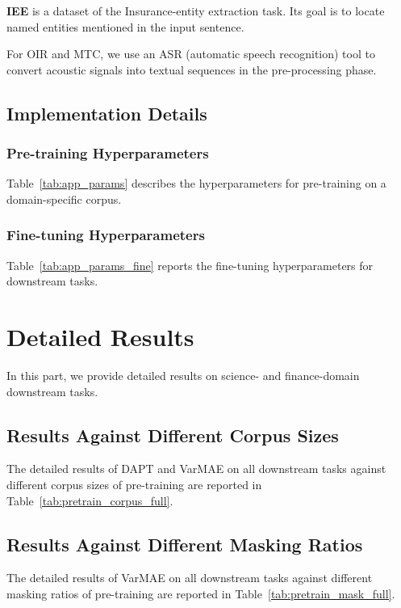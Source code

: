 \documentclass[11pt]{article}
\begin{document}
\textbf{IEE} is a dataset of the Insurance-entity extraction task. Its goal is to locate named entities mentioned in the input sentence.

For OIR and MTC, we use an ASR (automatic speech recognition) tool to convert acoustic signals into textual sequences in the pre-processing phase.



\subsection{Implementation Details} \label{sec:appendix_exp}

\subsubsection{Pre-training Hyperparameters} \label{sec:appendix_exp_pretrain}
Table~\ref{tab:app_params} describes the hyperparameters for pre-training on a domain-specific corpus.



\subsubsection{Fine-tuning Hyperparameters}  \label{sec:appendix_exp_fine}
Table~\ref{tab:app_params_fine} reports the fine-tuning hyperparameters for downstream tasks.




\section{Detailed Results} \label{sec:appendix_result}


In this part, we provide detailed results on science- and finance-domain downstream tasks.


\subsection{Results Against Different Corpus Sizes} \label{sec:appendix_corpus}
The detailed results of DAPT and VarMAE on all downstream tasks against different corpus sizes of pre-training are reported in Table~\ref{tab:pretrain_corpus_full}.


\subsection{Results Against Different Masking Ratios} \label{sec:appendix_mask}
{The detailed results of VarMAE on all downstream tasks against different masking ratios of pre-training are reported in Table~\ref{tab:pretrain_mask_full}.}
\end{document}
